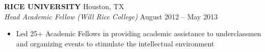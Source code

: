 \documentclass[margin]{res}
\begin{document}
\begin{resume}
{\bf RICE UNIVERSITY} Houston, TX \\
{\em Head Academic Fellow (Will Rice College)} \hfill
August 2012 -- May 2013 \\                                          \vspace{-4mm}
\begin{itemize}                                         \itemsep1pt %
        \item   Led 25+ Academic Fellows in providing academic assistance to underclassmen and organizing events to stimulate the intellectual environment
\end{itemize}
\vspace{-2mm}


\end{resume}
\end{document}

